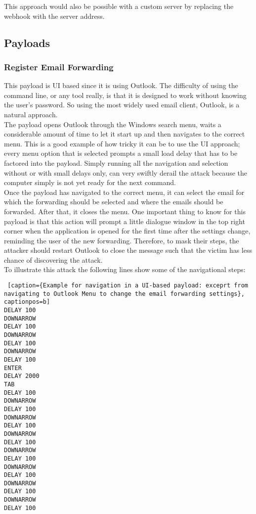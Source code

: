 This approach would also be possible with a custom server by replacing the webhook with the server address.



\subsection{Payloads}

\subsubsection{Register Email Forwarding}

This payload is UI based since it is using Outlook. The difficulty of using the command line, or any tool really, is that it is designed to work without knowing the user's password. So using the most widely used email client, Outlook, is a natural approach. \\
The payload opens Outlook through the Windows search menu, waits a considerable amount of time to let it start up and then navigates to the correct menu. This is a good example of how tricky it can be to use the UI approach; every menu option that is selected prompts a small load delay that has to be factored into the payload. Simply running all the navigation and selection without or with small delays only, can very swiftly derail the attack because the computer simply is not yet ready for the next command. \\
Once the payload has navigated to the correct menu, it can select the email for which the forwarding should be selected and where the emails should be forwarded. After that, it closes the menu. One important thing to know for this payload is that this action will prompt a little dialogue window in the top right corner when the application is opened for the first time after the settings change, reminding the user of the new forwarding. Therefore, to mask their steps, the attacker should restart Outlook to close the message such that the victim has less chance of discovering the attack. \\
To illustrate this attack the following lines show some of the navigational steps:


\begin{lstlisting} [caption={Example for navigation in a UI-based payload: exceprt from navigating to Outlook Menu to change the email forwarding settings}, captionpos=b]
DELAY 100
DOWNARROW
DELAY 100
DOWNARROW
DELAY 100
DOWNARROW
DELAY 100
ENTER
DELAY 2000
TAB
DELAY 100
DOWNARROW
DELAY 100
DOWNARROW
DELAY 100
DOWNARROW
DELAY 100
DOWNARROW
DELAY 100
DOWNARROW
DELAY 100
DOWNARROW
DELAY 100
DOWNARROW
DELAY 100
\end{lstlisting}

